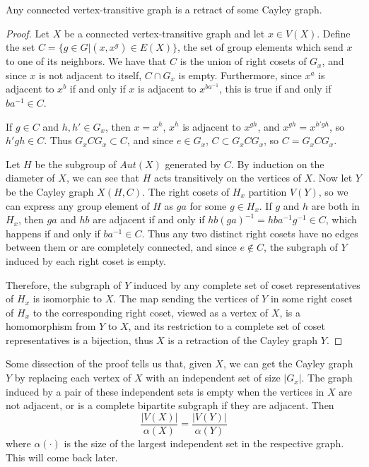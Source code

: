 \begin{theorem}
	Any connected vertex-transitive graph is a retract of some Cayley graph.
\end{theorem}
\begin{proof}
	Let $X$ be a connected vertex-transitive graph and let $x\in V(X)$.  Define the set $C=\{ g\in G|(x,x^g)\in E(X) \}$, the set of group elements which send $x$ to one of its neighbors.  We have that $C$ is the union of right cosets of $G_x$, and since $x$ is not adjacent to itself, $C\cap G_x$ is empty.  Furthermore, since $x^a$ is adjacent to $x^b$ if and only if $x$ is adjacent to $x^{ba^{-1}}$, this is true if and only if $ba^{-1}\in C$.
	
	If $g\in C$ and $h,h'\in G_x$, then $x=x^h$, $x^h$ is adjacent to $x^{gh}$, and $x^{gh}=x^{h'gh}$, so $h'gh\in C$.  Thus $G_x CG_x\subset C$, and since $e\in G_x$, $C\subset G_x C G_x$, so $C=G_x CG_x$.
	
	Let $H$ be the subgroup of $Aut(X)$ generated by $C$.  By induction on the diameter of $X$, we can see that $H$ acts transitively on the vertices of $X$.  Now let $Y$ be the Cayley graph $X(H,C)$.  The right cosets of $H_x$ partition $V(Y)$, so we can express any group element of $H$ as $ga$ for some $g\in H_x$.  If $g$ and $h$ are both in $H_x$, then $ga$ and $hb$ are adjacent if and only if $hb(ga)^{-1}=hba^{-1}g^{-1}\in C$, which happens if and only if $ba^{-1}\in C$.  Thus any two distinct right cosets have no edges between them or are completely connected, and since $e\notin C$, the subgraph of $Y$ induced by each right coset is empty.
	
	Therefore, the subgraph of $Y$ induced by any complete set of coset representatives of $H_x$ is isomorphic to $X$.  The map sending the vertices of $Y$ in some right coset of $H_x$ to the corresponding right coset, viewed as a vertex of $X$, is a homomorphism from $Y$ to $X$, and its restriction to a complete set of coset representatives is a bijection, thus $X$ is a retraction of the Cayley graph $Y$.
\end{proof}


Some dissection of the proof tells us that, given $X$, we can get the Cayley graph $Y$ by replacing each vertex of $X$ with an independent set of size $|G_x|$.  The graph induced by a pair of these independent sets is empty when the vertices in $X$ are not adjacent, or is a complete bipartite subgraph if they are adjacent. Then
$$\frac{|V(X)|}{\alpha(X)}=\frac{|V(Y)|}{\alpha(Y)}$$
where $\alpha(\cdot)$ is the size of the largest independent set in the respective graph.  This will come back later.


